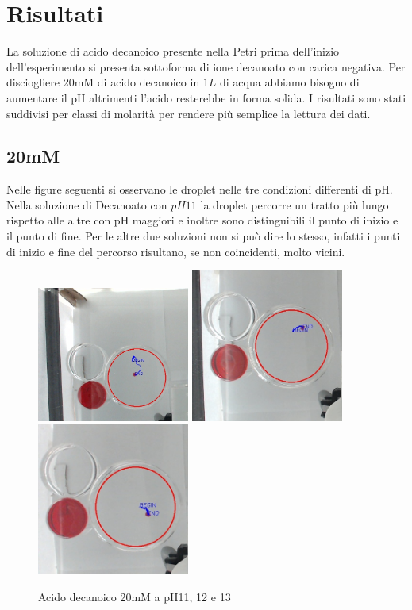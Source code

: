 \section{Risultati}
La soluzione di acido decanoico presente nella Petri prima dell'inizio dell'esperimento si presenta sottoforma di ione decanoato con carica negativa. Per disciogliere 20mM di acido decanoico in $1L$ di acqua abbiamo bisogno di aumentare il pH altrimenti l'acido resterebbe in forma solida. I risultati sono stati suddivisi per classi di molarità per rendere più semplice la lettura dei dati.

\subsection{20mM}
Nelle figure seguenti si osservano le droplet nelle tre condizioni differenti di pH. Nella soluzione di Decanoato con $pH11$ la droplet percorre un tratto più lungo rispetto alle altre con pH maggiori e inoltre sono distinguibili il punto di inizio e il punto di fine. Per le altre due soluzioni non si può dire lo stesso, infatti i punti di inizio e fine del percorso risultano, se non coincidenti, molto vicini. 
\begin{figure}[h]
	\centering
   		{\includegraphics[width=5cm]{immagini/20mMpH11-2.jpg}} %
 	\hspace{2mm}   	
		{\includegraphics[width=5cm]{immagini/20mMpH12-2.jpg}}%
	\hspace{2mm}   	
		{\includegraphics[width=5cm]{immagini/20mMpH13-2.jpg}}%
	\caption{Acido decanoico 20mM a pH11, 12 e 13}
\end{figure}
